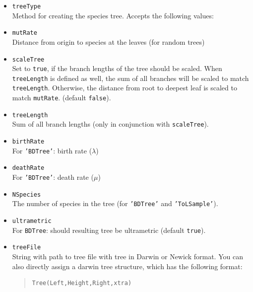 \documentclass[11pt]{article}
\begin{document}
\begin{itemize}
\item{\texttt{treeType}} \hfill \\
Method for creating the species tree. Accepts the following values:
\item{\texttt{mutRate}} \hfill \\
Distance from origin to species at the leaves (for random trees)
\item{\texttt{scaleTree}} \hfill \\
Set to \texttt{true}, if the branch lengths of the tree should be scaled. When \texttt{treeLength} is defined as well, the sum of all branches will be scaled to match \texttt{treeLength}. Otherwise, the distance from root to deepest leaf is scaled to match \texttt{mutRate}. (default \texttt{false}).
\item{\texttt{treeLength}} \hfill \\
Sum of all branch lengths (only in conjunction with \texttt{scaleTree}).
\item{\texttt{birthRate}} \hfill \\
For \texttt{'BDTree'}: birth rate ($\lambda$)
\item{\texttt{deathRate}} \hfill \\
For \texttt{'BDTree'}: death rate ($\mu$)
\item{\texttt{NSpecies}} \hfill \\
The number of species in the tree (for \texttt{'BDTree'} and \texttt{'ToLSample'}).
\item{\texttt{ultrametric}} \hfill \\
For \texttt{BDTree}: should resulting tree be ultrametric (default \texttt{true}).
\item{\texttt{treeFile}} \hfill \\
String with path to tree file with tree in Darwin or Newick format. You can also directly assign a darwin tree structure, which has the following format:
\begin{quote}
\begin{verbatim}
Tree(Left,Height,Right,xtra)
\end{verbatim}
\end{quote}


\end{itemize}
\end{document}
